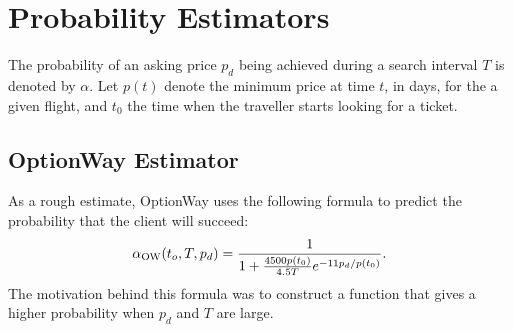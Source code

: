 \documentclass{article}
\begin{document}
\section{Probability Estimators}
The probability of an asking price $p_d$ being achieved during a
search interval $T$ is denoted by $\alpha$.  Let $p(t)$ denote the
minimum price at time $t$, in days, for the a given flight, and $t_0$
the time when the traveller starts looking for a ticket.

\subsection{OptionWay Estimator}
As a rough estimate, OptionWay uses the following formula to predict
the probability that the client will succeed:
\begin{dmath}
  \alpha_{\rm{OW}}(t_o,T,p_d)
  = \frac{1}{1 + \frac{4500 p(t_0)}{4.5 T}e^{-11 p_d / p(t_0)}}.
  \label{owalpha}
\end{dmath}
The motivation behind this formula was to construct a function that
gives a higher probability when $p_d$ and $T$ are large.
\end{document}
